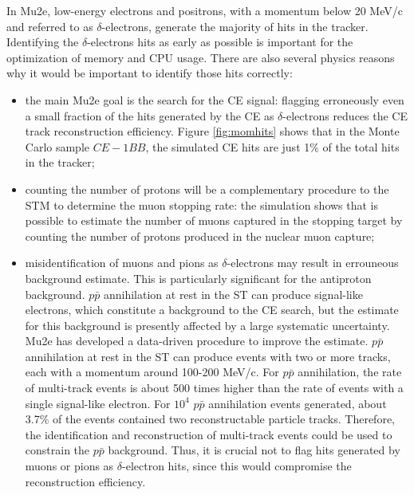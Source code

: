 In Mu2e, low-energy electrons 
and positrons, with a momentum below 20 MeV/c and 
referred to as $\delta$-electrons, 
generate the majority of hits in the tracker. 
Identifying the $\delta$-electrons hits as early 
as possible is important for the optimization of memory 
and CPU usage. There are also several physics 
reasons why it would be important to identify 
those hits correctly:
\begin{itemize}
    \item the main Mu2e goal is the search for the 
    CE signal: flagging erroneously even a small 
    fraction of the hits generated by the 
    CE as $\delta$-electrons reduces the CE track reconstruction efficiency. 
    Figure \ref{fig:momhits} shows that in the 
    Monte Carlo sample $CE-1BB$, the simulated CE 
    hits are just 1\% of the total hits in the tracker;
    \item counting the number of protons 
    will be a complementary procedure to the 
    STM to determine the muon stopping rate: 
    the simulation shows that is possible to 
    estimate the number of muons captured in 
    the stopping target by counting the number 
    of protons produced in the nuclear muon 
    capture;
    \item misidentification of muons 
      and pions as $\delta$-electrons 
    may result in errouneous background estimate. 
    This is particularly significant for the 
    antiproton background.
    $p\bar{p}$ annihilation at rest in the ST 
    can produce signal-like electrons, which 
    constitute a background to the CE search, 
    but the estimate for this background is 
    presently affected by a large systematic 
    uncertainty. Mu2e has developed a data-driven 
    procedure to improve the estimate.
    $p\bar{p}$ annihilation at rest in the ST 
    can produce events with two or more tracks, 
    each with a momentum around 100-200 MeV/c. 
    For $p\bar{p}$ annihilation, 
    the rate of multi-track events 
    is about 500 times higher 
    than the rate of events with a single 
    signal-like electron. 
    For $10^4$ $p\bar{p}$ annihilation events 
    generated, about 3.7\% of 
    the events contained two reconstructable 
    particle tracks. Therefore, 
    the identification and reconstruction of 
    multi-track events could be 
    used to constrain the $p\bar{p}$ background. 
    Thus, it is crucial not to flag hits 
    generated by muons or pions as $\delta$-electron 
    hits, since this would compromise the 
    reconstruction efficiency. 
\end{itemize}
